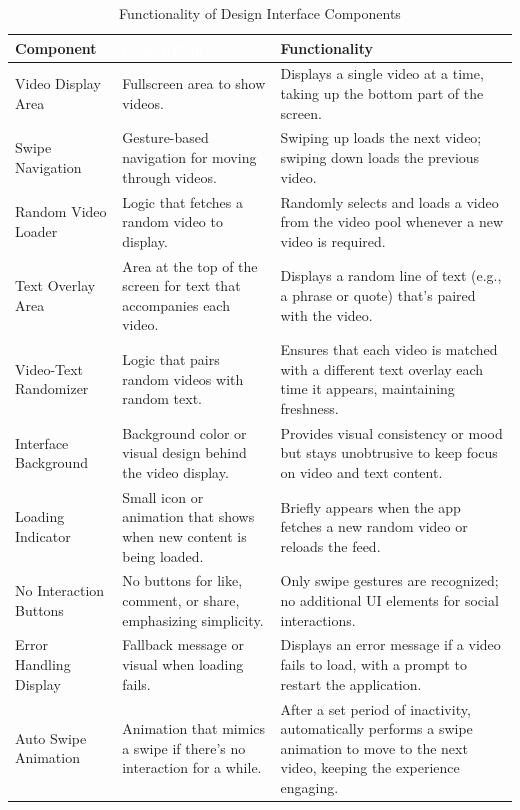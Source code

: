 \documentclass{article}
\begin{document}
\begin{table}[H]
\centering
\renewcommand{\arraystretch}{1.5}
\setlength{\tabcolsep}{12pt}
    \begin{tabularx}{\textwidth}{|l|X|X|}
        \hline
        \cellcolor{TikTokRed}\textbf{Component} & \cellcolor{TikTokBlack}\textbf{\textcolor{white}{Description}} & \cellcolor{TikTokLightBlue}\textbf{Functionality} \\
        \hline
        Video Display Area & Fullscreen area to show videos. & Displays a single video at a time, taking up the bottom part of the screen. \\
        \hline
        Swipe Navigation & Gesture-based navigation for moving through videos. & Swiping up loads the next video; swiping down loads the previous video. \\
        \hline
        Random Video Loader & Logic that fetches a random video to display. & Randomly selects and loads a video from the video pool whenever a new video is required. \\
        \hline
        Text Overlay Area & Area at the top of the screen for text that accompanies each video. & Displays a random line of text (e.g., a phrase or quote) that’s paired with the video. \\
        \hline
        Video-Text Randomizer & Logic that pairs random videos with random text. & Ensures that each video is matched with a different text overlay each time it appears, maintaining freshness. \\
        \hline
        Interface Background & Background color or visual design behind the video display. & Provides visual consistency or mood but stays unobtrusive to keep focus on video and text content. \\
        \hline
        Loading Indicator & Small icon or animation that shows when new content is being loaded. & Briefly appears when the app fetches a new random video or reloads the feed. \\
        \hline
        No Interaction Buttons & No buttons for like, comment, or share, emphasizing simplicity. & Only swipe gestures are recognized; no additional UI elements for social interactions. \\
        \hline
        Error Handling Display & Fallback message or visual when loading fails. & Displays an error message if a video fails to load, with a prompt to restart the application. \\
        \hline
        Auto Swipe Animation & Animation that mimics a swipe if there’s no interaction for a while. & After a set period of inactivity, automatically performs a swipe animation to move to the next video, keeping the experience engaging. \\
        \hline
    \end{tabularx}
    \caption{Functionality of Design Interface Components}
\end{table}
\end{document}
